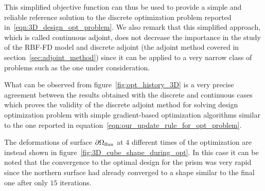 This simplified objective function can thus be used to provide a simple and reliable reference solution to the discrete optimization problem reported in~\eqref{eqn:3D_design_opt_problem}. We also remark that this simplified approach, which is called continuous adjoint, does not decrease the importance in the study of the RBF-FD model and discrete adjoint (the adjoint method covered in section~\vref{sec:adjoint_method}) since it can be applied to a very narrow class of problems such as the one under consideration.

What can be observed from figure~\ref{fig:opt_history_3D} is a very precise agreement between the results obtained with the discrete and continuous cases which proves the validity of the discrete adjoint method for solving design optimization problem with simple gradient-based optimization algorithms similar to the one reported in equation~\eqref{eqn:our_update_rule_for_opt_problem}.

The deformations of surface $\partial\Omega_\textup{flux}$ at $4$ different times of the optimization are instead shown in figure~\ref{fig:3D_cube_shape_during_opt}. In this case it can be noted that the convergence to the optimal design for the prism was very rapid since the northern surface had already converged to a shape similar to the final one after only $15$ iterations.

